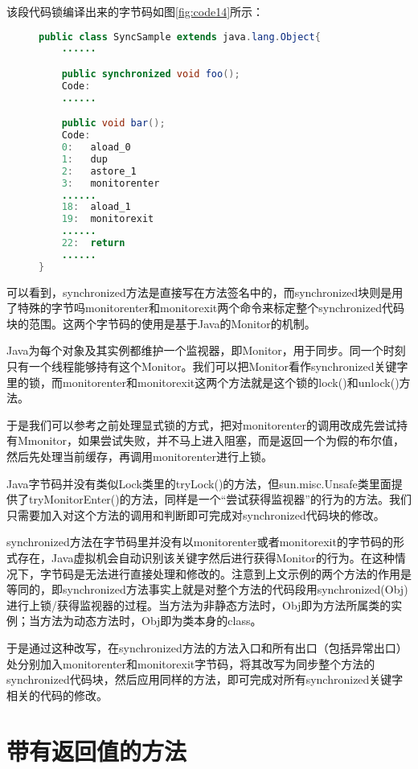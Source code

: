 该段代码锁编译出来的字节码如图\ref{fig:code14}所示：

\begin{figure}[!htp]
\begin{lstlisting}[language=Java]
public class SyncSample extends java.lang.Object{
	......

	public synchronized void foo();
	Code:
	......

	public void bar();
	Code:
	0:   aload_0
	1:   dup
	2:   astore_1
	3:   monitorenter
	......
	18:  aload_1
	19:  monitorexit
	......
	22:  return
	......
}
\end{lstlisting}
\end{figure}

可以看到，synchronized方法是直接写在方法签名中的，而synchronized块则是用了特殊的字节吗monitorenter和monitorexit两个命令来标定整个synchronized代码块的范围。这两个字节码的使用是基于Java的Monitor的机制。

Java为每个对象及其实例都维护一个监视器，即Monitor，用于同步。同一个时刻只有一个线程能够持有这个Monitor。我们可以把Monitor看作synchronized关键字里的锁，而monitorenter和monitorexit这两个方法就是这个锁的lock()和unlock()方法。

于是我们可以参考之前处理显式锁的方式，把对monitorenter的调用改成先尝试持有Mmonitor，如果尝试失败，并不马上进入阻塞，而是返回一个为假的布尔值，然后先处理当前缓存，再调用monitorenter进行上锁。

Java字节码并没有类似Lock类里的tryLock()的方法，但sun.misc.Unsafe类里面提供了tryMonitorEnter()的方法，同样是一个“尝试获得监视器”的行为的方法。我们只需要加入对这个方法的调用和判断即可完成对synchronized代码块的修改。

synchronized方法在字节码里并没有以monitorenter或者monitorexit的字节码的形式存在，Java虚拟机会自动识别该关键字然后进行获得Monitor的行为。在这种情况下，字节码是无法进行直接处理和修改的。注意到上文示例的两个方法的作用是等同的，即synchronized方法事实上就是对整个方法的代码段用synchronized(Obj)进行上锁/获得监视器的过程。当方法为非静态方法时，Obj即为方法所属类的实例；当方法为动态方法时，Obj即为类本身的class。

于是通过这种改写，在synchronized方法的方法入口和所有出口（包括异常出口）处分别加入monitorenter和monitorexit字节码，将其改写为同步整个方法的synchronized代码块，然后应用同样的方法，即可完成对所有synchronized关键字相关的代码的修改。

\section{带有返回值的方法}

